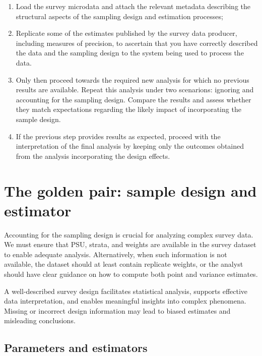 \documentclass[
  12pt,
]{book}
\begin{document}
\begin{enumerate}
\def\labelenumi{\arabic{enumi}.}
\item
  Load the survey microdata and attach the relevant metadata describing the structural aspects of the sampling design and estimation processes;
\item
  Replicate some of the estimates published by the survey data producer, including measures of precision, to ascertain that you have correctly described the data and the sampling design to the system being used to process the data.
\item
  Only then proceed towards the required new analysis for which no previous results are available. Repeat this analysis under two scenarions: ignoring and accounting for the sampling design. Compare the results and assess whether they match expectations regarding the likely impact of incorporating the sample design.
\item
  If the previous step provides results as expected, proceed with the interpretation of the final analysis by keeping only the outcomes obtained from the analysis incorporating the design effects.
\end{enumerate}

\hypertarget{the-golden-pair-sample-design-and-estimator}{%
\chapter{The golden pair: sample design and estimator}\label{the-golden-pair-sample-design-and-estimator}}

Accounting for the sampling design is crucial for analyzing complex survey data. We must ensure that PSU, strata, and weights are available in the survey dataset to enable adequate analysis. Alternatively, when such information is not available, the dataset should at least contain replicate weights, or the analyst should have clear guidance on how to compute both point and variance estimates.

A well-described survey design facilitates statistical analysis, supports effective data interpretation, and enables meaningful insights into complex phenomena. Missing or incorrect design information may lead to biased estimates and misleading conclusions.

\hypertarget{parameters-and-estimators}{%
\section{Parameters and estimators}\label{parameters-and-estimators}}
\end{document}
